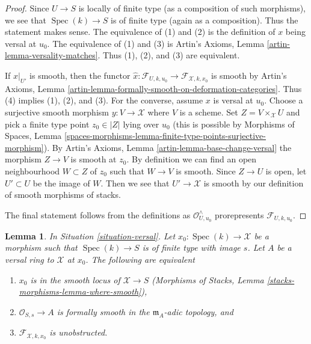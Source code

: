 \documentclass{stacks-project}
\theoremstyle{plain}
\newtheorem{lemma}[subsection]{Lemma}
\theoremstyle{definition}
\theoremstyle{remark}
\numberwithin{equation}{subsection}
\def\Spec{\mathop{\mathrm{Spec}}}
\begin{document}
\begin{proof}
Since $U \to S$ is locally of finite type (as a composition of such morphisms),
we see that $\Spec(k) \to S$ is of finite type (again as a composition).
Thus the statement makes sense. The equivalence of (1) and (2)
is the definition of $x$ being versal at $u_0$.
The equivalence of (1) and (3) is
Artin's Axioms, Lemma \ref{artin-lemma-versality-matches}.
Thus (1), (2), and (3) are equivalent.

\medskip\noindent
If $x|_{U'}$ is smooth, then the functor
$\hat x : \mathcal{F}_{U, k, u_0} \to \mathcal{F}_{\mathcal{X}, k, x_0}$
is smooth by Artin's Axioms, Lemma
\ref{artin-lemma-formally-smooth-on-deformation-categories}.
Thus (4) implies (1), (2), and (3).
For the converse, assume $x$ is versal at $u_0$.
Choose a surjective smooth morphism $y : V \to \mathcal{X}$ where $V$
is a scheme. Set $Z = V \times_\mathcal{X} U$ and pick a finite type
point $z_0 \in |Z|$ lying over $u_0$ (this is possible by
Morphisms of Spaces, Lemma
\ref{spaces-morphisms-lemma-finite-type-points-surjective-morphism}).
By Artin's Axioms, Lemma \ref{artin-lemma-base-change-versal}
the morphism $Z \to V$ is smooth at $z_0$.
By definition we can find an open neighbourhood $W \subset Z$
of $z_0$ such that $W \to V$ is smooth. Since $Z \to U$ is open,
let $U' \subset U$ be the image of $W$. Then we see that
$U' \to \mathcal{X}$ is smooth by our definition of smooth morphisms
of stacks.

\medskip\noindent
The final statement follows from the definitions as
$\mathcal{O}_{U, u_0}^\wedge$
prorepresents $\mathcal{F}_{U, k, u_0}$.
\end{proof}

\begin{lemma}
\label{lemma-characterize-smoothness}
In Situation \ref{situation-versal}. Let $x_0 : \Spec(k) \to \mathcal{X}$
be a morphism such that $\Spec(k) \to S$ is of finite type with image $s$.
Let $A$ be a versal ring to $\mathcal{X}$ at $x_0$. The following
are equivalent
\begin{enumerate}
\item $x_0$ is in the smooth locus of $\mathcal{X} \to S$
(Morphisms of Stacks, Lemma \ref{stacks-morphisms-lemma-where-smooth}),
\item $\mathcal{O}_{S, s} \to A$ is formally smooth in the
$\mathfrak m_A$-adic topology, and
\item $\mathcal{F}_{\mathcal{X}, k, x_0}$ is unobstructed.
\end{enumerate}
\end{lemma}
\end{document}
